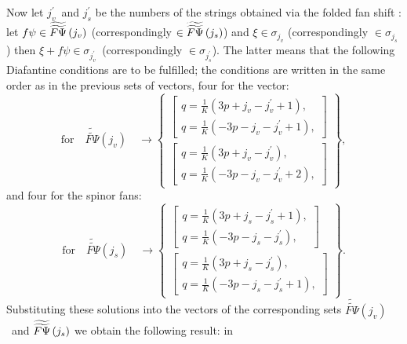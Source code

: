 \documentclass{article}
\begin{document}
Now let $j_{v}^{\prime }$\ and $j_{s}^{\prime }$ be the numbers of the
strings obtained via the folded fan shift : let $f\psi \in \widetilde{%
\widetilde{F\Psi }}\left( j_{v}\right) $ (correspondingly $\in \widetilde{%
\widetilde{F\Psi }}\left( j_{s}\right) $) and $\xi \in \sigma _{j_{v}}$
(correspondingly $\in \sigma _{j_{s}}$) then $\xi +f\psi \in \sigma
_{j_{v}^{\prime }}$\ (correspondingly $\in \sigma _{j_{s}^{\prime }}$). The
latter means that the following Diafantine conditions are to be fulfilled;
the conditions are written in the same order as in the previous sets of
vectors, four for the vector: 
\begin{equation*}
\mathrm{for}\quad \widetilde{\widetilde{F\Psi }}\left( j_{v}\right) \quad
\rightarrow \left\{ 
\begin{array}{c}
\left[ 
\begin{array}{c}
q=\frac{1}{K}\left( 3p+j_{v}-j_{v}^{\prime }+1\right) , \\ 
q=\frac{1}{K}\left( -3p-j_{v}-j_{v}^{\prime }+1\right) ,
\end{array}
\right] \\ 
\left[ 
\begin{array}{c}
q=\frac{1}{K}\left( 3p+j_{v}-j_{v}^{\prime }\right) , \\ 
q=\frac{1}{K}\left( -3p-j_{v}-j_{v}^{\prime }+2\right) ,
\end{array}
\right]
\end{array}
\right\} ,
\end{equation*}
and four for the spinor fans: 
\begin{equation*}
\mathrm{for}\quad \widetilde{\widetilde{F\Psi }}\left( j_{s}\right) \quad
\rightarrow \left\{ 
\begin{array}{c}
\left[ 
\begin{array}{c}
q=\frac{1}{K}\left( 3p+j_{s}-j_{s}^{\prime }+1\right) , \\ 
q=\frac{1}{K}\left( -3p-j_{s}-j_{s}^{\prime }\right) ,
\end{array}
\right] \\ 
\left[ 
\begin{array}{c}
q=\frac{1}{K}\left( 3p+j_{s}-j_{s}^{\prime }\right) , \\ 
q=\frac{1}{K}\left( -3p-j_{s}-j_{s}^{\prime }+1\right) ,
\end{array}
\right]
\end{array}
\right\} .
\end{equation*}
Substituting these solutions into the vectors of the corresponding sets $%
\widetilde{\widetilde{F\Psi }}\left( j_{v}\right) $\ and $\widetilde{%
\widetilde{F\Psi }}\left( j_{s}\right) $ we obtain the following result: in
\end{document}
